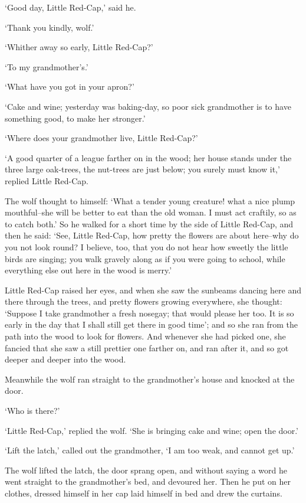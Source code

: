 \documentclass[oneside,11pt]{memoir} %
\begin{document}
	`Good day, Little Red-Cap,' said he.
	
	`Thank you kindly, wolf.'
	
	`Whither away so early, Little Red-Cap?'
	
	`To my grandmother's.'
	
	`What have you got in your apron?'
	
	`Cake and wine; yesterday was baking-day, so poor sick grandmother is to have something good, to make her stronger.'
	
	`Where does your grandmother live, Little Red-Cap?'
	
	`A good quarter of a league farther on in the wood; her house stands under the three large oak-trees, the nut-trees are just below; you surely must know it,' replied Little Red-Cap.
	
	The wolf thought to himself: `What a tender young creature! what a nice plump mouthful--she will be better to eat than the old woman. I must act craftily, so as to catch both.' So he walked for a short time by the side of Little Red-Cap, and then he said: `See, Little Red-Cap, how pretty the flowers are about here--why do you not look round? I believe, too, that you do not hear how sweetly the little birds are singing; you walk gravely along as if you were going to school, while everything else out here in the wood is merry.'
	
	Little Red-Cap raised her eyes, and when she saw the sunbeams dancing here and there through the trees, and pretty flowers growing everywhere, she thought: `Suppose I take grandmother a fresh nosegay; that would please her too. It is so early in the day that I shall still get there in good time'; and so she ran from the path into the wood to look for flowers. And whenever she had picked one, she fancied that she saw a still prettier one farther on, and ran after it, and so got deeper and deeper into the wood.
	
	Meanwhile the wolf ran straight to the grandmother's house and knocked at the door.
	
	`Who is there?'
	
	`Little Red-Cap,' replied the wolf. `She is bringing cake and wine; open the door.'
	
	`Lift the latch,' called out the grandmother, `I am too weak, and cannot get up.'
	
	The wolf lifted the latch, the door sprang open, and without saying a word he went straight to the grandmother's bed, and devoured her. Then he put on her clothes, dressed himself in her cap laid himself in bed and drew the curtains.
	
\end{document}
